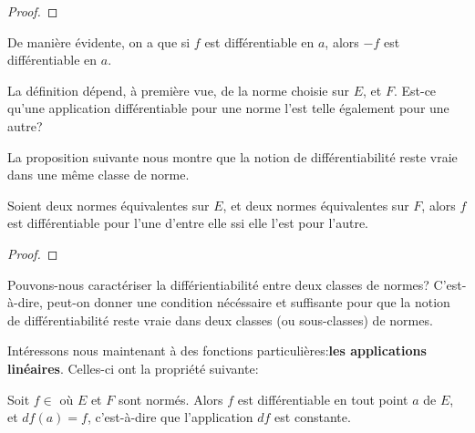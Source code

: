 \begin{proof}
	
\end{proof}

De manière évidente, on a que si $f$ est différentiable en $a$, alors $-f$ est
différentiable en $a$.

La définition dépend, à première vue, de la norme choisie sur $E$, et $F$. Est-ce
qu'une application différentiable pour une norme l'est telle également pour une
autre?

La proposition suivante nous montre que la notion de différentiabilité reste
vraie dans une même classe de norme.

\begin{proposition}
	Soient deux normes équivalentes sur $E$, et deux normes équivalentes sur
	$F$, alors $f$ est différentiable pour l'une d'entre elle ssi elle l'est
	pour l'autre.
\end{proposition}

\begin{proof}
	
\end{proof}

\begin{question}
	Pouvons-nous caractériser la différientiabilité entre deux classes de
	normes? C'est-à-dire, peut-on donner une condition nécéssaire et suffisante
	pour que la notion de différentiabilité reste vraie dans deux classes (ou
	sous-classes) de normes.
\end{question}



Intéressons nous maintenant à des fonctions particulières:\textbf{les applications
linéaires}.
Celles-ci ont la propriété suivante:

\begin{proposition}
	Soit $f \in$  où $E$ et $F$ sont normés. Alors $f$ est
	différentiable en tout point $a$ de $E$, et $df(a) = f$, c'est-à-dire que
	l'application $df$ est constante.
\end{proposition}


